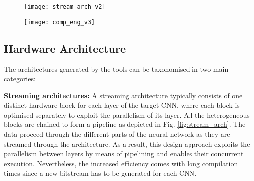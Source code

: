\documentclass[format=acmsmall, review=false, screen=true]{acmart}
\begin{document}
\begin{figure}%
	\centering
	\vspace{-0.25cm}
\begin{minipage}{.58\textwidth}
	\centering
	\texttt{[image: stream\_arch\_v2]}
	\label{fig:stream_arch}
\end{minipage}
\begin{minipage}{.39\textwidth}
	\centering
	\texttt{[image: comp\_eng\_v3]}
	\vspace{-0.75cm}
	\label{fig:comp_eng}
\end{minipage}
\vspace{-0.5cm}
\end{figure}


\begin{comment}
\begin{figure}[t] %
	\centering
	\texttt{[image: stream\_arch\_v2]}
	\caption{Example of a tailored streaming accelerator architecture}
	\label{fig:stream_arch}
\end{figure}

\begin{figure}[t] %
	\centering
	\texttt{[image: comp\_eng\_v3]}
	\caption{Example of single computation engine accelerator}
	\label{fig:comp_eng}
\end{figure}
\end{comment}

\subsection{Hardware Architecture}
\label{hw_arch}

The architectures generated by the tools can be taxonomised in two main categories:


\textbf{Streaming architectures:}
A streaming architecture typically consists of one distinct hardware block for each layer of the target CNN, where each block is optimised separately to exploit the parallelism of its layer. All the heterogeneous blocks are chained to form a pipeline as depicted in Fig. \ref{fig:stream_arch}. The data proceed through the different parts of the neural network as they are streamed through the architecture. As a result, this design approach exploits the parallelism between layers by means of pipelining and enables their concurrent execution. Nevertheless, the increased efficiency comes with long compilation times since a new bitstream has to be generated for each CNN. 
\end{document}
